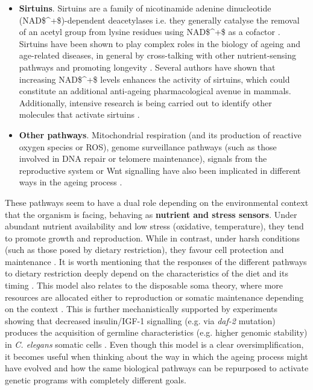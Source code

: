 \begin{itemize}
	\item \textbf{Sirtuins}. Sirtuins are a family of nicotinamide adenine dinucleotide (\acrshort{NAD$^+$})-dependent deacetylases i.e. they generally catalyse the removal of an acetyl group from lysine residues using \acrshort{NAD$^+$} as a cofactor \cite{Bonkowski2016}. Sirtuins have been shown to play complex roles in the biology of ageing and age-related diseases, in general by cross-talking with other nutrient-sensing pathways and promoting longevity \cite{Kenyon2010,Bonkowski2016}. Several authors have shown that increasing \acrshort{NAD$^+$} levels enhances the activity of sirtuins, which could constitute an additional anti-ageing pharmacological avenue in mammals. Additionally, intensive research is being carried out to identify other molecules that activate sirtuins \cite{Bonkowski2016}.
	
	\item \textbf{Other pathways}. Mitochondrial respiration (and its production of reactive oxygen species or \acrshort{ROS}), genome surveillance pathways (such as those involved in DNA repair or telomere maintenance), signals from the reproductive system or Wnt signalling have also been implicated in different ways in the ageing process \cite{Kenyon2010,Greer2008, Lezzerini2014}.
	
\end{itemize}


These pathways seem to have a dual role depending on the environmental context that the organism is facing, behaving as \textbf{nutrient and stress sensors}. Under abundant nutrient availability and low stress (oxidative, temperature), they tend to promote growth and reproduction. While in contrast, under harsh conditions (such as those posed by dietary restriction), they favour cell protection and maintenance \cite{Kenyon2005,Kenyon2010}. It is worth mentioning that the responses of the different pathways to dietary restriction deeply depend on the characteristics of the diet and its timing \cite{Kenyon2010}. This model also relates to the disposable soma theory, where more resources are allocated either to reproduction or somatic maintenance depending on the context \cite{Kirkwood1977,Kirkwood1991}. This is further mechanistically supported by experiments showing that decreased insulin/IGF-1 signalling (e.g. via \textit{daf-2} mutation) produces the acquisition of germline characteristics (e.g. higher genomic stability) in \textit{C. elegans} somatic cells \cite{Curran2009}. Even though this model is a clear oversimplification, it becomes useful when thinking about the way in which the ageing process might have evolved and how the same biological pathways can be repurposed to activate genetic programs with completely different goals.

